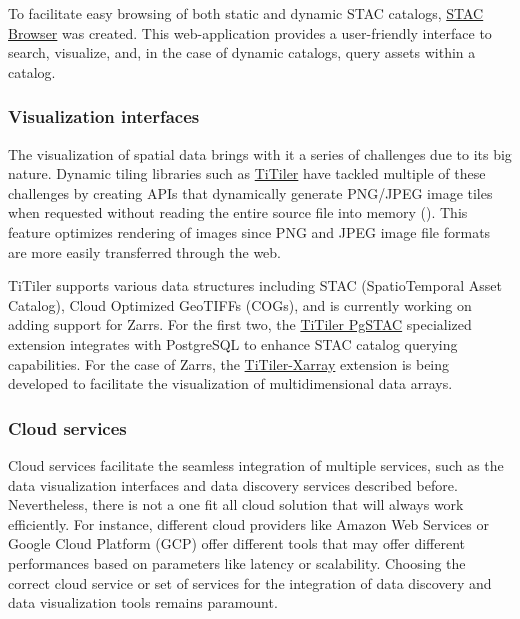 \documentclass[
  oneside,
  open=any]{scrbook}
\begin{document}
To facilitate easy browsing of both static and dynamic STAC catalogs,
\href{https://github.com/radiantearth/stac-browser}{STAC Browser} was
created. This web-application provides a user-friendly interface to
search, visualize, and, in the case of dynamic catalogs, query assets
within a catalog.

\subsubsection*{Visualization
interfaces}\label{visualization-interfaces}

The visualization of spatial data brings with it a series of challenges
due to its big nature. Dynamic tiling libraries such as
\href{https://developmentseed.org/titiler/}{TiTiler} have tackled
multiple of these challenges by creating APIs that dynamically generate
PNG/JPEG image tiles when requested without reading the entire source
file into memory
(). This
feature optimizes rendering of images since PNG and JPEG image file
formats are more easily transferred through the web.

TiTiler supports various data structures including STAC (SpatioTemporal
Asset Catalog), Cloud Optimized GeoTIFFs (COGs), and is currently
working on adding support for Zarrs. For the first two, the
\href{https://github.com/stac-utils/titiler-pgstac}{TiTiler PgSTAC}
specialized extension integrates with PostgreSQL to enhance STAC catalog
querying capabilities. For the case of Zarrs, the
\href{https://github.com/developmentseed/titiler-xarray}{TiTiler-Xarray}
extension is being developed to facilitate the visualization of
multidimensional data arrays.

\subsubsection*{Cloud services}\label{cloud-services}

Cloud services facilitate the seamless integration of multiple services,
such as the data visualization interfaces and data discovery services
described before. Nevertheless, there is not a one fit all cloud
solution that will always work efficiently. For instance, different
cloud providers like Amazon Web Services or Google Cloud Platform (GCP)
offer different tools that may offer different performances based on
parameters like latency or scalability. Choosing the correct cloud
service or set of services for the integration of data discovery and
data visualization tools remains paramount.
\end{document}
